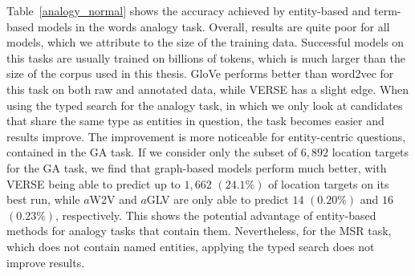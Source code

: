 Table~\ref{analogy_normal} shows the accuracy achieved by entity-based and term-based models in the words analogy task. Overall, results are quite poor for all models, which we attribute to the size of the training data. Successful models on this tasks are usually trained on billions of tokens, which is much larger than the size of the corpus used in this thesis. GloVe performs better than word2vec for this task on both raw and annotated data, while VERSE has a slight edge. When using the typed search for the analogy task, in which we only look at candidates that share the same type as entities in question, the task becomes easier and results improve. The improvement is more noticeable for entity-centric questions, contained in the GA task. If we consider only the subset of $6,892$ location targets for the GA task, we find that graph-based models perform much better, with VERSE being able to predict up to $1,662$ $(24.1\%)$ of location targets on its best run, while $a$W2V and $a$GLV are only able to predict $14$ $(0.20\%)$ and $16$ $(0.23\%)$, respectively. This shows the potential advantage of entity-based methods for analogy tasks that contain them. Nevertheless, for the MSR task, which does not contain named entities, applying the typed search does not improve results. 
\begin{table}[t]
\caption{Word analogy results. Shown is the prediction accuracy for the normal analogy tasks and the variation where predictions are limited to the correct entity type. The best two values per task and variation are highlighted.}
\label{analogy_normal}
\setlength{\tabcolsep}{2pt} %
\renewcommand{\arraystretch}{1.0} %
\end{table}

